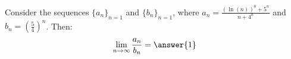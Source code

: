 \documentclass{ximera}
\author{Jim Talamo}
\begin{document}
\begin{exercise}

Consider the sequences $\{a_n \}_{n=1}$ and $\{b_n \}_{n=1}$, where $a_n =\frac{(\ln(n))^8+5^n}{n+4^n}$ and $b_n = \left(\frac{5}{4}\right)^n$.  Then:
\[
\lim_{n \to \infty} \frac{a_n}{b_n} = \answer{1}
\]

\end{exercise}
\end{document}
